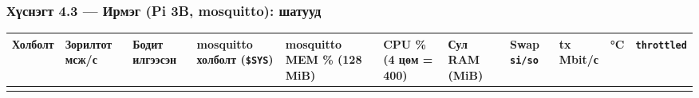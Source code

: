 \hypertarget{ux445ux4afux441ux43dux44dux433ux442-4.3-ux438ux440ux43cux44dux433-pi-3b-mosquitto-ux448ux430ux442ux443ux443ux434}{%
\subsubsection{Хүснэгт 4.3 --- Ирмэг (Pi 3B, mosquitto): шатууд}\label{ux445ux4afux441ux43dux44dux433ux442-4.3-ux438ux440ux43cux44dux433-pi-3b-mosquitto-ux448ux430ux442ux443ux443ux434}}

\begingroup\scriptsize\begin{longtable}[]{@{}lllllllllll@{}}
\toprule
\begin{minipage}[b]{0.07\columnwidth}\raggedright
Холболт\strut
\end{minipage} & \begin{minipage}[b]{0.07\columnwidth}\raggedright
Зорилтот мсж/с\strut
\end{minipage} & \begin{minipage}[b]{0.07\columnwidth}\raggedright
Бодит илгээсэн\strut
\end{minipage} & \begin{minipage}[b]{0.07\columnwidth}\raggedright
mosquitto холболт (\texttt{\$SYS})\strut
\end{minipage} & \begin{minipage}[b]{0.07\columnwidth}\raggedright
mosquitto MEM \% (128 MiB)\strut
\end{minipage} & \begin{minipage}[b]{0.07\columnwidth}\raggedright
CPU \% (4 цөм = 400)\strut
\end{minipage} & \begin{minipage}[b]{0.07\columnwidth}\raggedright
Сул RAM (MiB)\strut
\end{minipage} & \begin{minipage}[b]{0.07\columnwidth}\raggedright
Swap \texttt{si/so}\strut
\end{minipage} & \begin{minipage}[b]{0.07\columnwidth}\raggedright
tx Mbit/с\strut
\end{minipage} & \begin{minipage}[b]{0.07\columnwidth}\raggedright
°C\strut
\end{minipage} & \begin{minipage}[b]{0.07\columnwidth}\raggedright
\texttt{throttled}\strut
\end{minipage}\tabularnewline
\midrule
\endhead
\begin{minipage}[t]{0.07\columnwidth}\raggedright

\end{minipage}
\end{longtable}
